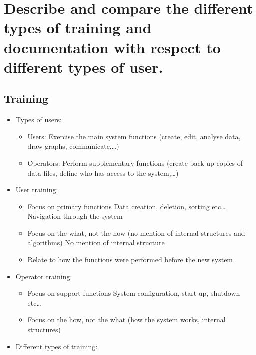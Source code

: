 \clearpage{}
\section{Describe and compare the different types of training and
documentation with respect to different types of user.}


\subsection{Training}

\begin{itemize}
        
\item Types of users:

\begin{itemize}
    \item Users: Exercise the main system functions (create, edit, analyse data, draw graphs, communicate,\ldots)
    \item Operators: Perform supplementary functions (create back up copies of data files, define who has access to the system,\ldots)
\end{itemize}

\item User training:

\begin{itemize}
    \item Focus on primary functions
        \subitem{} Data creation, deletion, sorting etc\ldots
        \subitem{} Navigation through the system
    \item Focus on the what, not the how (no mention of internal structures and algorithms)
        \subitem{} No mention of internal structure
    \item Relate to how the functions were performed before the new system
\end{itemize}

\item Operator training:

\begin{itemize}
    \item Focus on support functions
        \subitem{} System configuration, start up, shutdown etc\ldots
    \item Focus on the how, not the what (how the system works, internal structures)
\end{itemize}

\item Different types of training:


\end{itemize}
